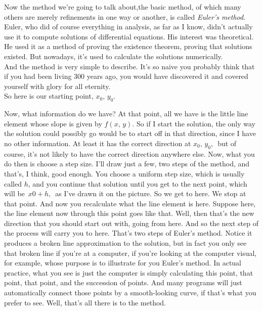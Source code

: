 Now the method we're going to talk about,the basic method, of which many others
are merely refinements in one way or another, is called \emph{Euler's method}. \\
Euler, who did of course everything in analysis,
as far as I know, didn't actually use it to compute solutions of differential equations.
His interest was theoretical.
He used it as a method of proving the existence theorem,
proving that solutions existed.
But nowadays, it's used to calculate the solutions numerically. \\

And the method is very simple to describe.
It's so naive you probably think that if you had been living
300 years ago, you would have discovered it and covered yourself with glory for all eternity.\\

So here is our starting point, $x_0,\, y_0$.



Now, what information do we have?
At that point, all we have is the little line element whose
slope is given by $f(x, \, y)$.
So if I start the solution, the only way the solution could possibly go would
be to start off in that direction, since I have no other information.
At least it has the correct direction at $x_0, \, y_0,\,$
but of course, it's not likely to have the correct direction
anywhere else.
Now, what you do then is choose a step size.
I'll draw just a few, two steps of the method, and that's, I think, good enough.
You choose a uniform step size, which is usually called $h$,
and you continue that solution until you get to the next point,
which will be $\, x0 +  h,\,$ as I've drawn it on the picture.
So we get to here. We stop at that point.
And now you recalculate what the line element is here.
Suppose here, the line element now through this point
goes like that.
Well, then that's the new direction that you should start out with, going from here.
And so the next step of the process will carry you to here.
That's two steps of Euler's method.
Notice it produces a broken line approximation to the solution,
but in fact you only see that broken line
if you're at a computer, if you're looking at the computer
visual, for example, whose purpose is to illustrate
for you Euler's method.
In actual practice, what you see is just the computer is simply calculating
this point, that point, that point, and the succession of points.
And many programs will just automatically connect
those points by a smooth-looking curve, if that's what you prefer to see.
Well, that's all there is to the method. \\

